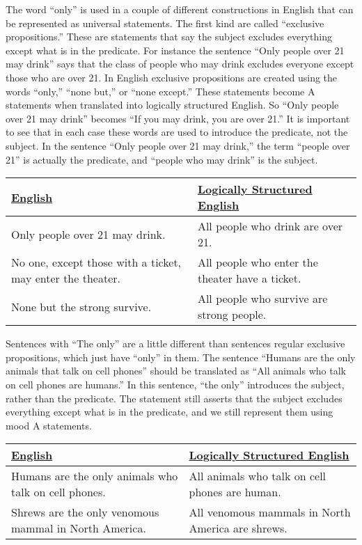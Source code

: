The word ``only'' is used in a couple of different constructions in English that can be represented as universal statements. The first kind are called ``exclusive propositions.'' These are statements that say the subject excludes everything except what is in the predicate. For instance the sentence ``Only people over 21 may drink'' says that the class of people who may drink excludes everyone except those who are over 21. In English exclusive propositions are created using the words ``only,'' ``none but,'' or ``none except.'' These statements become A statements when translated into logically structured English. So ``Only people over 21 may drink'' becomes ``If you may drink, you  are over 21.'' It is important to see that in each case these words are used to introduce the predicate, not the subject. In the sentence ``Only people over 21 may drink,'' the term ``people over 21'' is actually the  predicate, and ``people who may drink'' is the subject. 

\begin{longtabu}{p{.5\linewidth}p{.5\linewidth}}
\underline{English} &
\underline{Logically Structured English} \\
\endhead 
Only people over 21 may drink. &
All people who drink are over 21.\\

No one, except those with a ticket, may enter the theater. &
All people who enter the theater have a ticket. \\

None but the strong survive. &
All people who survive are strong people. \\
\end{longtabu}


Sentences with ``The only'' are a little different than sentences regular exclusive propositions, which just have ``only'' in them. The sentence ``Humans are the only animals that talk on cell phones'' should be translated as ``All animals who talk on cell phones are humans.'' In this sentence, ``the only'' introduces the subject, rather than the predicate. The statement still asserts that the subject excludes everything except what is in the predicate, and we still represent them using mood A statements.

\begin{longtabu}{p{.5\linewidth}p{.5\linewidth}}
\underline{English} &
\underline{Logically Structured English} \\
\endhead 
Humans are the only animals who talk on cell phones. &
All animals who talk on cell phones are human.\\

Shrews are the only venomous mammal in North America. &
All venomous mammals in North America are shrews.\\

\end{longtabu}

